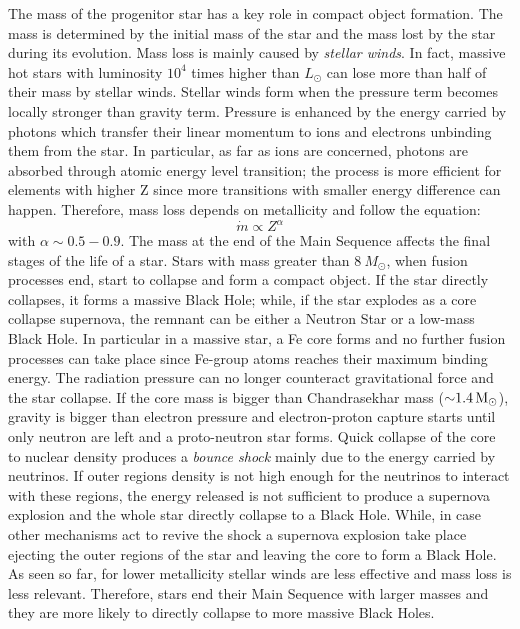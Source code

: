 \documentclass[prb,twocolumn,9pt]{revtex4-1}
\begin{document}
The mass of the progenitor star has a key role in compact object formation. The mass is determined by the initial mass of the star and the mass lost by the star during its evolution. Mass loss is mainly caused by \textit{stellar winds}. In fact, massive hot stars with luminosity \(10^4\) times higher than \(L_\odot\) can lose more than half of their mass by stellar winds. Stellar winds form when the pressure term becomes locally stronger than gravity term. Pressure is enhanced by the energy carried by photons which transfer their linear momentum to ions and electrons unbinding them from the star. In particular,  as far as ions are concerned, photons are absorbed through atomic energy level transition; the process is more efficient for elements with higher Z since more transitions with smaller energy difference can happen. Therefore, mass loss depends on metallicity and follow the equation: 
\begin{equation}
    \dot{m} \propto Z^{\alpha}
\end{equation}
with \( \alpha \sim 0.5 - 0.9\).
The mass at the end of the Main Sequence affects the final stages of the life of a star. Stars with mass greater than \(\SI{8}{M_\odot}\), when fusion processes end, start to collapse and form a compact object. If the star directly collapses, it forms a massive Black Hole; while, if the star explodes as a core collapse supernova, the remnant can be either a Neutron Star or a low-mass Black Hole. 
In particular in a massive star, a Fe core forms and no further fusion processes can take place since Fe-group atoms reaches their maximum binding energy. The radiation pressure can no longer counteract gravitational force and the star collapse. If the core mass is bigger than Chandrasekhar mass (\(\SI{\sim 1.4}{M_\odot}\)), gravity is bigger than electron pressure and electron-proton capture starts until only neutron are left and a proto-neutron star forms. Quick collapse of the core to nuclear density produces a \textit{bounce shock} mainly due to the energy carried by neutrinos. If outer regions density is not high enough for the neutrinos to interact with these regions, the energy released is not sufficient to produce a supernova explosion and the whole star directly collapse to a Black Hole. While, in case other mechanisms act to revive the shock a supernova explosion take place ejecting the outer regions of the star and leaving the core to form a Black Hole. 
As seen so far, for lower metallicity stellar winds are less effective and mass loss is less relevant. Therefore, stars end their Main Sequence with larger masses and they are more likely to directly collapse to more massive Black Holes.
\end{document}
